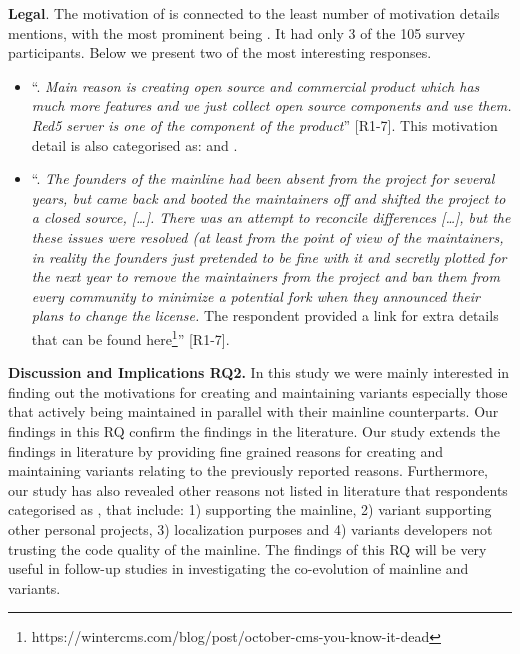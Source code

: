 \nd \textbf{Legal}. The motivation of  is connected to the least number of motivation details mentions, with the most prominent being . It had only 3 of the 105 survey participants. Below we present two of the most interesting responses.

\begin{itemize}[leftmargin=*]
\item ``. \emph{Main reason is creating open source and commercial product which has much more features and we just collect open source components and use them. Red5 server is one of the component of the product}'' [R1-7]. This motivation detail is also categorised as:  and .

\item ``. \emph{The founders of the mainline had been absent from the project for several years, but came back and booted the maintainers off and shifted the project to a closed source, [\ldots]. There was an attempt to reconcile differences [\ldots], but the these issues were resolved (at least from the point of view of the maintainers, in reality the founders just pretended to be fine with it and secretly plotted for the next year to remove the maintainers from the project and ban them from every community to minimize a potential fork when they announced their plans to change the license.} The respondent provided a link for extra details that can be found here\footnote{https://wintercms.com/blog/post/october-cms-you-know-it-dead}'' [R1-7].

\end{itemize}


\nd \textbf{Discussion and Implications RQ2.}
In this study we were mainly interested in finding out the motivations for creating and maintaining variants especially those that actively being maintained in parallel with their mainline counterparts.
Our findings in this RQ confirm the findings in the literature. 
Our study extends the findings in literature by providing fine grained reasons for creating and maintaining variants relating to the previously reported reasons.
Furthermore, our study has also revealed other reasons not listed in literature that respondents categorised as , that include: 1) supporting the mainline, 2) variant supporting other personal projects, 3) localization purposes and 4) variants developers not trusting the code quality of the mainline. 
The findings of this RQ will be very useful in follow-up studies in investigating the co-evolution of mainline and variants. 


